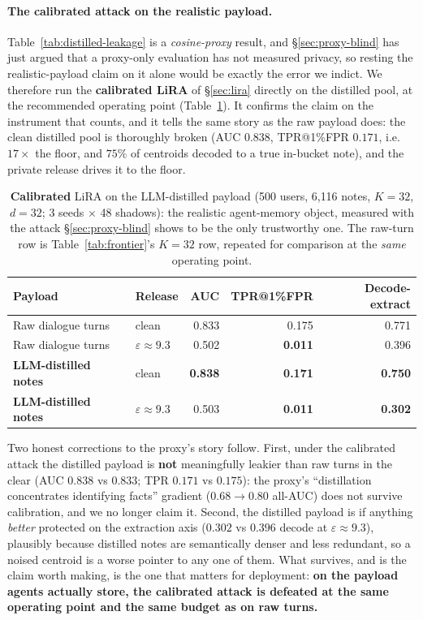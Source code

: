 \documentclass[pdflatex,sn-mathphys-num,iicol]{sn-jnl}
\theoremstyle{thmstyleone}%
\theoremstyle{thmstyletwo}%
\theoremstyle{thmstylethree}%
\newcommand{\eps}{\varepsilon}
\newcommand{\secref}[1]{\S\ref{#1}}
\begin{document}
\paragraph{The calibrated attack on the realistic payload.} Table~\ref{tab:distilled-leakage}
is a \emph{cosine-proxy} result, and \secref{sec:proxy-blind} has just argued that a
proxy-only evaluation has not measured privacy, so resting the realistic-payload claim on
it alone would be exactly the error we indict. We therefore run the \textbf{calibrated LiRA}
of \secref{sec:lira} directly on the distilled pool, at the recommended operating point
(Table~\ref{tab:distilled-lira}). It confirms the claim on the instrument that counts, and it
tells the same story as the raw payload does: the clean distilled pool is thoroughly broken
(AUC $0.838$, TPR@1\%FPR $0.171$, i.e.\ $17\times$ the floor, and $75\%$ of centroids decoded to
a true in-bucket note), and the private release drives it to the floor.

\begin{table}[t]
  \centering
  \caption{\textbf{Calibrated} LiRA on the LLM-distilled payload (500 users, 6{,}116 notes,
  $K = 32$, $d = 32$; 3 seeds $\times$ 48 shadows): the realistic agent-memory object, measured
  with the attack \secref{sec:proxy-blind} shows to be the only trustworthy one. The raw-turn
  row is Table~\ref{tab:frontier}'s $K = 32$ row, repeated for comparison at the \emph{same}
  operating point.}
  \label{tab:distilled-lira}
  \small
  \begin{tabular}{@{}llrrr@{}}
    \toprule
    Payload & Release & AUC & TPR@1\%FPR & Decode-extract \\
    \midrule
    Raw dialogue turns          & clean              & 0.833 & 0.175 & 0.771 \\
    Raw dialogue turns          & $\eps \approx 9.3$ & 0.502 & \textbf{0.011} & 0.396 \\
    \midrule
    \textbf{LLM-distilled notes} & clean              & \textbf{0.838} & \textbf{0.171} & \textbf{0.750} \\
    \textbf{LLM-distilled notes} & $\eps \approx 9.3$ & 0.503 & \textbf{0.011} & \textbf{0.302} \\
    \bottomrule
  \end{tabular}
\end{table}

Two honest corrections to the proxy's story follow. First, under the calibrated attack the
distilled payload is \textbf{not} meaningfully leakier than raw turns in the clear (AUC $0.838$
vs $0.833$; TPR $0.171$ vs $0.175$): the proxy's ``distillation concentrates identifying
facts'' gradient ($0.68 \to 0.80$ all-AUC) does not survive calibration, and we no longer claim
it. Second, the distilled payload is if anything \emph{better} protected on the extraction axis
($0.302$ vs $0.396$ decode at $\eps \approx 9.3$), plausibly because distilled notes are
semantically denser and less redundant, so a noised centroid is a worse pointer to any one of
them. What survives, and is the claim worth making, is the one that matters for deployment:
\textbf{on the payload agents actually store, the calibrated attack is defeated at the same
operating point and the same budget as on raw turns.}
\end{document}
